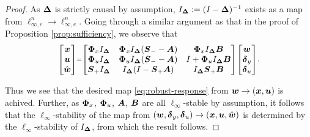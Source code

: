 \begin{proof}
As $\D$ is strictly causal by assumption, $I_\D:= (I-\D)^{-1}$ exists as a map from $\ell^n_{\infty,e} \to \ell^n_{\infty,e}$.  Going through a similar argument as that in the proof of Proposition \ref{prop:sufficiency}, we observe that
\begin{equation}
\scriptstyle
\begin{bmatrix}
\x \\ \uu \\ \what
\end{bmatrix} =
\begin{bmatrix} \Phix I_\D & \Phix I_\D(\Sm - \A) & \Phix I_\D \B \\
\Phiu I_\D& \Phiu I_\D(\Sm-\A) & I + \Phiu I_\D\B \\
\Sp I_\D & I_\D(I - \Sp\A) & I_\D\Sp \B
\end{bmatrix} \begin{bmatrix} \tf w \\ \tf \delta_y \\ \tf \delta_u \end{bmatrix}.
\end{equation}

Thus we see that the desired map \eqref{eq:robust-response} from $\w \to (\x,\uu)$ is achived.  Further, as $\Phix$, $\Phiu$, $\A$, $\B$ are all $\ell_\infty$-stable by assumption, it follows that the $\ell_\infty$-stability of the map from $(\tf w, \tf \delta_y, \tf \delta_u) \to (\x, \uu, \what)$ is determined by the $\ell_\infty$-stability of $I_\D$, from which the result follows.
\end{proof}
